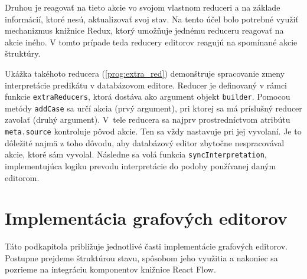 Druhou je reagovať na tieto akcie vo svojom vlastnom reduceri a na základe informácií, ktoré nesú, aktualizovať svoj stav. Na tento účel bolo potrebné využiť mechanizmus knižnice Redux, ktorý umožňuje jednému reduceru reagovať na akcie iného. V tomto prípade teda reducery editorov reagujú na spomínané akcie štruktúry.

Ukážka takéhoto reducera (\ref{prog:extra_red}) demonštruje spracovanie zmeny interpretácie predikátu v databázovom editore. Reducer je definovaný v rámci funkcie \texttt{extraReducers}, ktorá dostáva ako argument objekt \texttt{builder}. Pomocou metódy \texttt{addCase} sa určí akcia (prvý argument), pri ktorej sa má príslušný reducer zavolať (druhý argument). V~tele reducera sa najprv prostredníctvom atribútu \texttt{meta.source} kontroluje pôvod akcie. Ten sa vždy nastavuje pri jej vyvolaní. Je to dôležité najmä z toho dôvodu, aby databázový editor zbytočne nespracovával akcie, ktoré sám vyvolal. Následne sa volá funkcia \texttt{syncInterpretation}, implementujúca logiku prevodu interpretácie do podoby používanej daným editorom.


\section{Implementácia grafových editorov}
Táto podkapitola približuje jednotlivé časti implementácie grafových editorov. Postupne prejdeme štruktúrou stavu, spôsobom jeho využitia a nakoniec sa pozrieme na integráciu komponentov knižnice React Flow.



